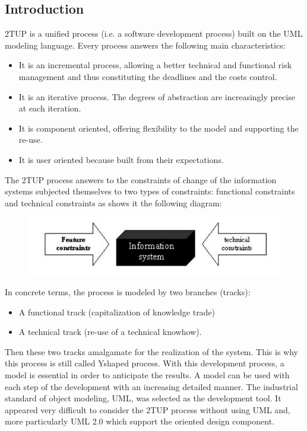 \subsection{Introduction}
\label{subsec:subsec01}
2TUP is a unified process (i.e. a software development
process) built on the UML modeling language.
Every process answers the following main characteristics: 
\begin{itemize}
  \item It is an incremental process, allowing a better
technical and functional risk management and thus
constituting the deadlines and the costs control. 
  \item It is an iterative process. The degrees of abstraction
are increasingly precise at each iteration. 
  \item It is component oriented, offering flexibility to the
model and supporting the re-use. 
  \item It is user oriented because built from their
expectations. 
\end{itemize}
The 2TUP process answers to the constraints of change of
the information systems subjected themselves to two types
of constraints: functional constraints and technical
constraints as shows it the following diagram: 
\begin{figure}[h!]
	\centering
	\includegraphics[height=0.1\textheight]{fig01/2TUPFeature}
	\label{fig:FilialesEtClients}
\end{figure}
In concrete terms, the process is modeled by two branches
(tracks): 
\begin{itemize}
  \item A functional track (capitalization of knowledge
trade)
  \item A technical track (re-use of a technical knowhow).
\end{itemize}
Then these two tracks amalgamate for the realization of
the system. This is why this process is still called Yshaped
process.
With this development process, a model is essential in
order to anticipate the results. A model can be used with
each step of the development with an increasing detailed
manner. The industrial standard of object modeling,
UML, was selected as the development tool. It appeared
very difficult to consider the 2TUP process without using
UML and, more particularly UML 2.0 which support the
oriented design component.

